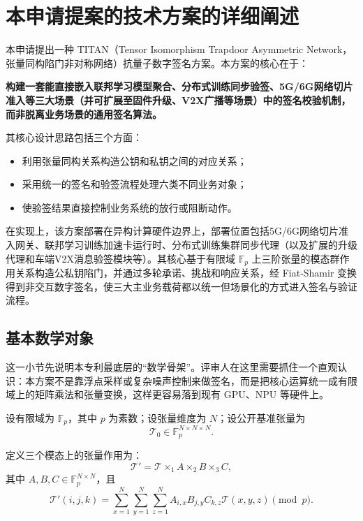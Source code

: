 \documentclass[12pt,a4paper]{article}
\begin{document}
\section{本申请提案的技术方案的详细阐述}

本申请提出一种 TITAN（Tensor Isomorphism Trapdoor Asymmetric Network，张量同构陷门非对称网络）抗量子数字签名方案。本方案的核心在于：

\textbf{构建一套能直接嵌入联邦学习模型聚合、分布式训练同步验签、5G/6G网络切片准入等三大场景（并可扩展至固件升级、V2X广播等场景）中的签名校验机制，而非脱离业务场景的通用签名算法。}

其核心设计思路包括三个方面：
\begin{itemize}
    \item 利用张量同构关系构造公钥和私钥之间的对应关系；
    \item 采用统一的签名和验签流程处理六类不同业务对象；
    \item 使验签结果直接控制业务系统的放行或阻断动作。
\end{itemize}

在实现上，该方案部署在异构计算硬件边界上，部署位置包括5G/6G网络切片准入网关、联邦学习训练加速卡运行时、分布式训练集群同步代理（以及扩展的升级代理和车端V2X消息验签模块等）。其核心基于有限域 $\mathbb{F}_p$ 上三阶张量的模态群作用关系构造公私钥陷门，并通过多轮承诺、挑战和响应关系，经 Fiat-Shamir 变换得到非交互数字签名，使三大主业务载荷都以统一但场景化的方式进入签名与验证流程。

\subsection{基本数学对象}

这一小节先说明本专利最底层的“数学骨架”。评审人在这里需要抓住一个直观认识：本方案不是靠浮点采样或复杂噪声控制来做签名，而是把核心运算统一成有限域上的矩阵乘法和张量变换，这样更容易落到现有 GPU、NPU 等硬件上。

设有限域为 $\mathbb{F}_p$，其中 $p$ 为素数；设张量维度为 $N$；设公开基准张量为
\[
\mathcal{T}_0 \in \mathbb{F}_p^{N \times N \times N}.
\]

定义三个模态上的张量作用为：
\[
\mathcal{T}' = \mathcal{T} \times_1 A \times_2 B \times_3 C,
\]
其中 $A,B,C \in \mathbb{F}_p^{N \times N}$，且
\[
\mathcal{T}'(i,j,k)=\sum_{x=1}^{N}\sum_{y=1}^{N}\sum_{z=1}^{N}
A_{i,x}B_{j,y}C_{k,z}\mathcal{T}(x,y,z)\pmod p.
\]
\end{document}

